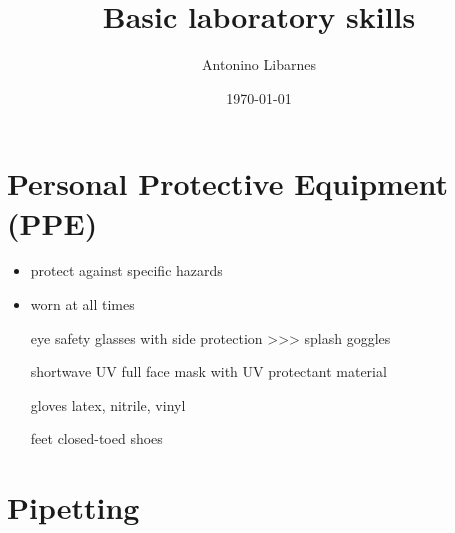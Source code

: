 \documentclass[11pt]{article}
\author{Antonino Libarnes}
\date{\today}
\title{Basic laboratory skills}
\begin{document}
\maketitle
\tableofcontents

\section{Personal Protective Equipment (PPE)}
\label{sec:orgee80a07}
\begin{itemize}
\item protect against specific hazards
\item worn at all times
\item[{eye}] safety glasses with side protection >>> splash goggles
\item[{shortwave UV}] full face mask with UV protectant material
\item[{gloves}] latex, nitrile, vinyl
\item[{feet}] closed-toed shoes
\end{itemize}
\section{Pipetting}
\label{sec:orgd9d7be5}
\end{document}
